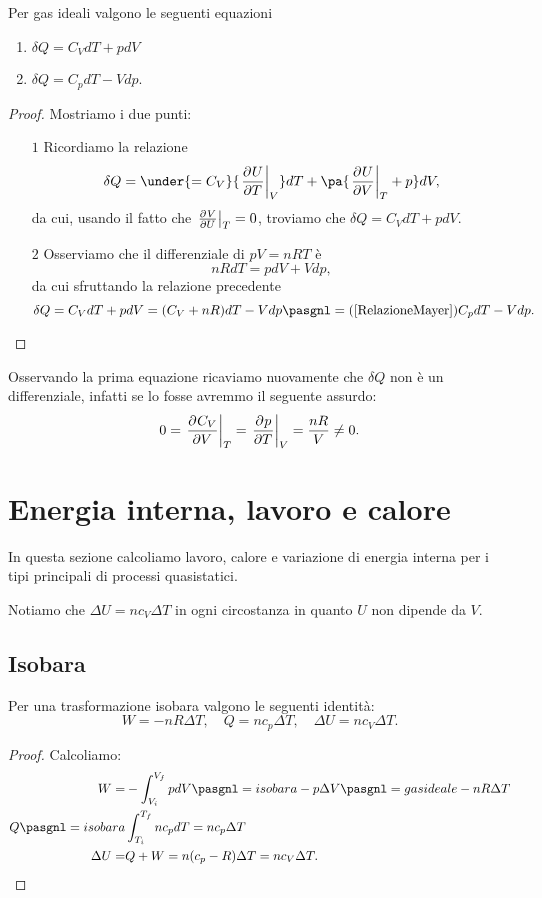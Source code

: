 \begin{proposition}\label{CaloreInfinitesimaleConCapacita}
Per gas ideali valgono le seguenti equazioni
\begin{enumerate}
\item $\delta Q=C_VdT+pdV$
\item $\delta Q=C_p dT-Vdp$.
\end{enumerate}
\end{proposition}
\begin{proof}
Mostriamo i due punti:
\setlength{\leftmargini}{0cm}
\begin{itemize}
\item[$\boxed{1}$] Ricordiamo la relazione \[\delta Q=\under{=C_V}{\ppb TUV} dT+\pa{{\ppb VUT}+p}dV,\]
da cui, usando il fatto che $\ppb UVT=0$, troviamo che $\delta Q=C_V dT+pdV$.
\item[$\boxed{2}$] Osserviamo che il differenziale di $pV=nRT$ \`e
\[nRdT=pdV+Vdp,\]
da cui sfruttando la relazione precedente
\[\delta Q=C_VdT+pdV=({C_V+nR})dT-Vdp\pasgnl={(\ref{RelazioneMayer})}C_p dT-Vdp.\]
\end{itemize}
\setlength{\leftmargini}{0.5cm}
\end{proof}
\begin{remark}
Osservando la prima equazione ricaviamo nuovamente che $\delta Q$ non \`e un differenziale, infatti se lo fosse avremmo il seguente assurdo:
\[0=\ppb V{C_V}T=\ppb TpV=\frac{nR}V\neq 0.\]
\end{remark}


\section{Energia interna, lavoro e calore}

\noindent In questa sezione calcoliamo lavoro, calore e variazione di energia interna per i tipi principali di processi quasistatici.\medskip

\noindent Notiamo che $\Delta U=nc_V\Delta T$ in ogni circostanza in quanto $U$ non dipende da $V$.
\subsection{Isobara}
\begin{proposition}\label{EnergieIsobara}
Per una trasformazione isobara valgono le seguenti identit\`a:
\[W=-nR\Delta T,\quad
Q=nc_p\Delta T,\quad
\Delta U=nc_V\Delta T.\]
\end{proposition}
\begin{proof}
Calcoliamo:
\begin{align*}
W=&-\int_{V_i}^{V_f}pdV\pasgnl={isobara}-p\Delta V\pasgnl={gas ideale}-nR\Delta T\\
Q\pasgnl={isobara}&\int_{T_i}^{T_f}nc_pdT=nc_p\Delta T\\
\Delta U=&Q+W=n(c_p-R)\Delta T=nc_V\Delta T.
\end{align*}
\end{proof}


